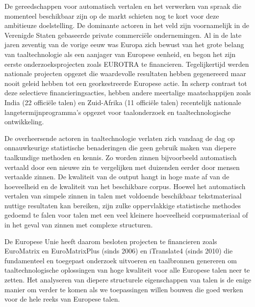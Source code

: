 \documentclass[]{../../metanetpaper}
\begin{document}
\begin{multicols}{2}

    De gereedschappen voor automatisch vertalen en het verwerken van spraak die momenteel beschikbaar zijn op de markt schieten nog te kort voor deze ambitieuze doelstelling. De dominante actoren in het veld zijn voornamelijk in de Verenigde Staten gebaseerde private commerci{\"e}le ondernemingen. Al in de late jaren zeventig van de vorige eeuw was Europa zich bewust van het grote belang van taaltechnologie als een aanjager van Europese eenheid, en begon het zijn eerste onderzoeksprojecten zoals EUROTRA te financieren. Tegelijkertijd werden nationale projecten opgezet die waardevolle resultaten hebben gegenereerd maar nooit geleid hebben tot een georkestreerde Europese actie. In scherp contrast tot deze selectieve financieringsacties, hebben andere meertalige maatschappijen zoals India (22 offici{\"e}le talen) en Zuid-Afrika (11 offici{\"e}le talen) recentelijk nationale langetermijnprogramma's opgezet voor taalonderzoek en taaltechnologische ontwikkeling.

    De overheersende actoren in taaltechnologie verlaten zich vandaag de dag op onnauwkeurige statistische benaderingen die geen gebruik maken van diepere taalkundige methoden en kennis. Zo worden zinnen bijvoorbeeld automatisch vertaald door een nieuwe zin te vergelijken met duizenden eerder door mensen vertaalde zinnen. De kwaliteit van de output hangt in hoge mate af van de hoeveelheid en de kwaliteit van het beschikbare corpus. Hoewel het automatisch vertalen van simpele zinnen in talen met voldoende beschikbaar tekstmateriaal nuttige resultaten kan bereiken, zijn zulke oppervlakkige statistische methodes gedoemd te falen voor talen met een veel kleinere hoeveelheid corpusmateriaal of in het geval van zinnen met complexe structuren.

    De Europese Unie heeft daarom besloten projecten te financieren zoals EuroMatrix en EuroMatrixPlus (sinds 2006) en iTranslate4 (sinds 2010) die fundamenteel en toegepast onderzoek uitvoeren en taalbronnen genereren om taaltechnologische oplossingen van hoge kwaliteit voor alle Europese talen neer te zetten. Het analyseren van diepere structurele eigenschappen van talen is de enige manier om verder te komen als we toepassingen willen bouwen die goed werken voor de hele reeks van Europese talen.


\end{multicols}
\end{document}
